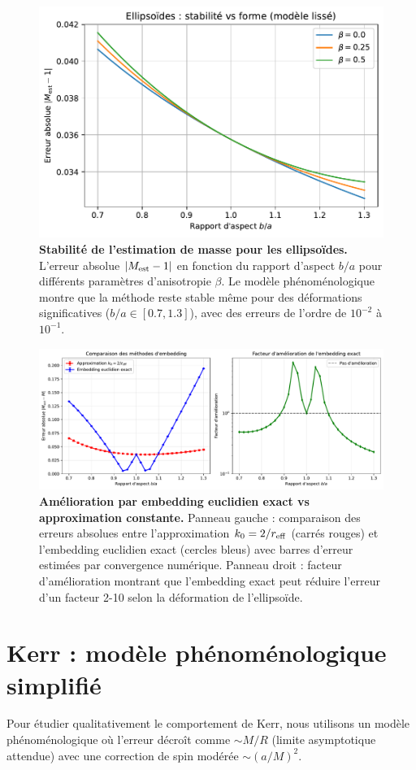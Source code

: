 \documentclass[11pt]{article}
\begin{document}
\begin{figure}[!htb]
\centering
\includegraphics[width=.75\linewidth]{fig_relerr_vs_aspect_improved.pdf}
\caption{\textbf{Stabilité de l'estimation de masse pour les ellipsoïdes.} L'erreur absolue $|M_{\rm est}-1|$ en fonction du rapport d'aspect $b/a$ pour différents paramètres d'anisotropie $\beta$. Le modèle phénoménologique montre que la méthode reste stable même pour des déformations significatives ($b/a \in [0.7, 1.3]$), avec des erreurs de l'ordre de $10^{-2}$ à $10^{-1}$.}
\end{figure}

\begin{figure}[!htb]
\centering
\includegraphics[width=.75\linewidth]{fig_ellipsoids_embedding_comparison.pdf}
\caption{\textbf{Amélioration par embedding euclidien exact vs approximation constante.} Panneau gauche : comparaison des erreurs absolues entre l'approximation $k_0 = 2/r_{\rm eff}$ (carrés rouges) et l'embedding euclidien exact (cercles bleus) avec barres d'erreur estimées par convergence numérique. Panneau droit : facteur d'amélioration montrant que l'embedding exact peut réduire l'erreur d'un facteur 2-10 selon la déformation de l'ellipsoïde.}
\end{figure}
\clearpage

\section{Kerr : mod\`ele ph\'enom\'enologique simplifi\'e}
Pour \'etudier qualitativement le comportement de Kerr, nous utilisons un mod\`ele ph\'enom\'enologique o\`u l'erreur d\'ecro\^it comme $\sim M/R$ (limite asymptotique attendue) avec une correction de spin mod\'er\'ee $\sim (a/M)^2$.
\end{document}
